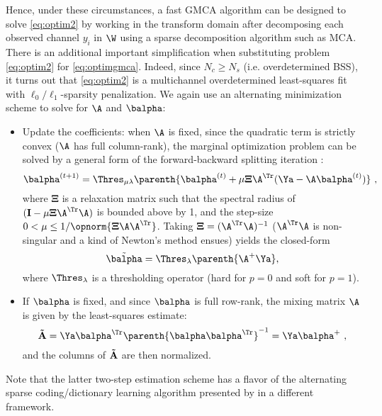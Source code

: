 Hence, under these circumstances, a fast GMCA algorithm can be designed to solve \eqref{eq:optim2} by working in the transform domain after decomposing each observed channel $y_i$ in ${\W}$ using a sparse decomposition algorithm such as MCA. There is an additional important simplification when substituting problem \eqref{eq:optim2} for \eqref{eq:optimgmca}. Indeed, since $N_c \geq N_s$ (i.e. overdetermined BSS), it turns out that \eqref{eq:optim2} is a multichannel overdetermined least-squares fit with $\ell_0/\ell_1$-sparsity penalization. We again use an alternating minimization scheme to solve for $\A$ and $\balpha$:
\begin{itemize}
\item Update the coefficients: when $\A$ is fixed, since the quadratic term is strictly convex ($\A$ has full column-rank), the marginal optimization problem can be solved by a general form of the forward-backward splitting iteration \citep{ChenRockafellar97}:
\begin{equation}
\balpha^{(t+1)} = \Thres_{\mu\lambda} \parenth{\balpha^{(t)} + \mu{\boldsymbol \Xi} \A^\Tr(\Ya - {\A}\balpha^{(t)})} ~,
\end{equation}
where ${\boldsymbol \Xi}$ is a relaxation matrix such that the spectral radius of $({\bf I} - \mu{\boldsymbol \Xi}\A^\Tr\A)$ is bounded above by 1, and the step-size $0 < \mu \leq 1/\opnorm{{\boldsymbol \Xi}\A\A^\Tr}$. Taking ${\boldsymbol \Xi} = (\A^\Tr\A)^{-1}$ ($\A^\Tr\A$ is non-singular and a kind of Newton's method ensues) yields the closed-form
\begin{equation}
\tilde{\balpha}  =  \Thres_{\lambda}\parenth{\A^{+}\Ya}, 
\end{equation}
where $\Thres_{\lambda}$ is a thresholding operator (hard for $p=0$ and soft for $p=1$).
\item If $\balpha$ is fixed, and since $\balpha$ is full row-rank, the mixing matrix $\A$ is given by the least-squares estimate: 
\begin{equation}
{\bf \tilde{A}} = \Ya\balpha^\Tr\parenth{\balpha\balpha^\Tr}^{-1} = \Ya\balpha^+ ~,
\end{equation}
and the columns of ${\bf \tilde{A}}$ are then normalized.
\end{itemize}
Note that the latter two-step estimation scheme has a flavor of the alternating sparse coding/dictionary learning algorithm presented by \citet{ksvd:elad,fadili:peyrespie07} in a different framework.

